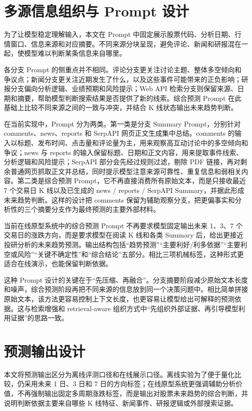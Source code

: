\section{多源信息组织与 Prompt 设计}

为了让模型稳定理解输入，本文在 Prompt 中固定展示股票代码、分析日期、行情窗口、信息来源和对应摘要。不同来源分块呈现，避免评论、新闻和研报混在一起，使模型难以判断某条信息来自哪里。

各分支 Prompt 的侧重点并不相同。评论分支更关注讨论主题、整体多空倾向和争议点；新闻分支更关注近期发生了什么，以及这些事件可能带来的正负影响；研报分支偏向分析逻辑、业绩预期和风险提示；Web API 检索分支则保留来源、日期和摘要，帮助模型判断搜索结果是否提供了新的线索。综合预测 Prompt 在此基础上比较不同来源之间的一致与冲突，并结合 K 线状态输出未来趋势判断。

在当前实现中，Prompt 分为两类。第一类是分支 Summary Prompt，分别针对 comments、news、reports 和 SerpAPI 网页正文生成集中总结。comments 的输入以标题、发布时间、点击量和评论量为主，用来观察高互动讨论中的多空倾向和争议；news 与 reports 的输入保留标题、日期和正文内容，用来提取事件线索、分析逻辑和风险提示；SerpAPI 部分会先经过规则过滤，剔除 PDF 链接，再对剩余普通网页抓取正文并总结，同时提示模型注意来源可靠性、重复信息和弱相关内容。第二类是综合预测 Prompt，它不再直接消费所有原始文本，而是只接收最近 7 个交易日 K 线以及已生成的 news / reports / SerpAPI Summary，并据此形成未来趋势判断。这样的设计把 comments 保留为辅助观察分支，把更偏事实和分析性的三个摘要分支作为最终预测的主要外部材料。

当前在线原型系统中的综合预测 Prompt 不再要求模型固定输出未来 1、3、7 个交易日的涨跌方向，而是要求模型在阅读 K 线和各类 Summary 后，给出更接近投研分析的未来趋势预测。输出结构包括“趋势预测”“主要利好/利多依据”“主要利空或风险”“关键不确定性”和“综合结论”五部分。相比三项机械标签，这种形式更适合在线演示，也能保留判断依据。

这种 Prompt 设计的关键在于“先压缩、再融合”。分支摘要阶段减少原始文本长度和噪声，综合预测阶段再把不同来源的信息放到同一个决策问题中。相比简单拼接原始文本，该方法更容易控制上下文长度，也更容易让模型给出可解释的预测依据。这与检索增强和 retrieval-aware 组织方式中“先组织外部证据、再引导模型利用证据”的思路一致\cite{lewis2020rag,ye2024r2ag}。

\section{预测输出设计}

本文将预测输出区分为离线评测口径和在线展示口径。离线实验为了便于量化比较，仍采用未来 1 日、3 日和 7 日的方向标签；在线原型系统更强调辅助分析价值，不再强制输出固定多周期涨跌标签，而是输出对股票未来趋势的综合判断，并说明判断依据主要来自哪些 K 线特征、新闻事件、研报逻辑或外部搜索证据。

